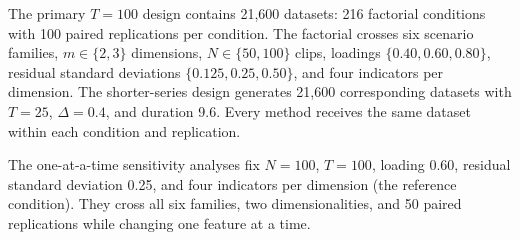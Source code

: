 \documentclass[
]{article}
\begin{document}
The primary \(T=100\) design contains 21,600 datasets: 216 factorial
conditions with 100 paired replications per condition. The factorial
crosses six scenario families, \(m\in\{2,3\}\) dimensions,
\(N\in\{50,100\}\) clips, loadings \(\{0.40,0.60,0.80\}\), residual
standard deviations \(\{0.125,0.25,0.50\}\), and four indicators per
dimension. The shorter-series design generates 21,600 corresponding
datasets with \(T=25\), \(\Delta=0.4\), and duration 9.6. Every method
receives the same dataset within each condition and replication.

The one-at-a-time sensitivity analyses fix \(N=100\), \(T=100\), loading
0.60, residual standard deviation 0.25, and four indicators per
dimension (the reference condition). They cross all six families, two
dimensionalities, and 50 paired replications while changing one feature
at a time.

\begin{table}[H]

\caption{\label{tbl-challenge-variants}One-at-a-time sensitivity
conditions. Each changes one design component of the reference
condition.}


\end{table}%
\end{document}
